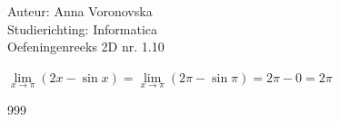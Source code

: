 \documentclass[a4paper]{article}
\begin{document}
\noindent \large Auteur: Anna Voronovska \\
\noindent \large Studierichting: Informatica \\
\noindent \large Oefeningenreeks 2D nr. 1.10 \\

\bigskip 

\normalsize

$\lim\limits_{x \to \pi} \left( 2x - \sin x \right) =\lim\limits_{x \to \pi} \left( 2\pi - \sin \pi \right) =2\pi - 0 = 2\pi$


\begin{thebibliography}{999}
\end{thebibliography}
\end{document}
